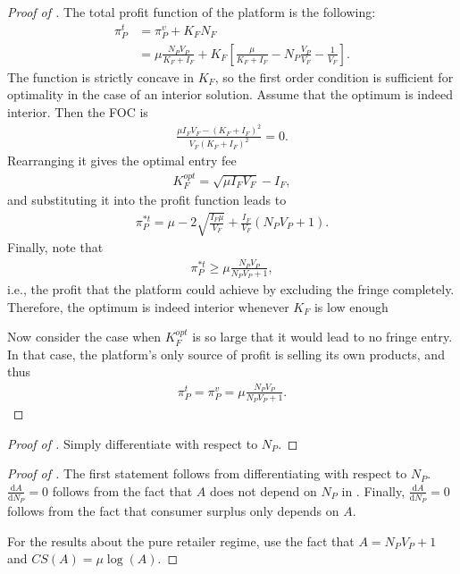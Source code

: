 \documentclass[a4paper]{article}
\newcommand{\dd}{\mathrm{d}}
\begin{document}
\begin{proof}[Proof of ]
    The total profit function of the platform is the following:
    \begin{align}
        \pi_P^t &= \pi_P^v + K_F N_F \nonumber \\
        &= \mu \frac{N_P V_P}{K_F + I_F} + K_F \left[ \frac{\mu}{K_F + I_F} - N_P \frac{V_P}{V_F} - \frac{1}{V_F} \right]. \label{eq:platform_profits}
    \end{align}
    The function is strictly concave in $K_F$, so the first order condition is sufficient for optimality in the case of an interior solution.
    Assume that the optimum is indeed interior.
    Then the FOC is
    \begin{align*}
        \frac{\mu I_F V_F - (K_F + I_F)^2}{V_F (K_F + I_F)^2} = 0.
    \end{align*}
    Rearranging it gives the optimal entry fee
    \begin{align*}
        K_F^{opt} = \sqrt{\mu I_F V_F} - I_F,
    \end{align*}
    and substituting it into the profit function leads to
    \begin{align*}
        \pi_P^{*t} = \mu - 2\sqrt{\frac{I_F \mu}{V_F}} + \frac{I_F}{V_F} (N_P V_P + 1).
    \end{align*}
    Finally, note that
    \begin{align*}
        \pi_P^{*t} \geq \mu \frac{N_P V_P}{N_P V_P + 1},
    \end{align*}
    i.e., the profit that the platform could achieve by excluding the fringe completely.
    Therefore, the optimum is indeed interior whenever $K_F$ is low enough

    Now consider the case when $K_F^{opt}$ is so large that it would lead to no fringe entry.
    In that case, the platform's only source of profit is selling its own products, and thus
    \begin{align*}
        \pi_P^{t} = \pi_P^{v} = \mu \frac{ N_P V_P}{N_P V_P + 1}.
    \end{align*}
\end{proof}

\begin{proof}[Proof of ]
    Simply differentiate  with respect to $N_P$.
\end{proof}

\begin{proof}[Proof of ]
    The first statement follows from differentiating  with respect to $N_P$.
    $\frac{\dd A}{\dd N_P} = 0$ follows from the fact that $A$ does not depend on $N_P$ in .
    Finally, $\frac{\dd A}{\dd N_P} = 0$ follows from the fact that consumer surplus only depends on $A$.
    
    For the results about the pure retailer regime, use the fact that $A = N_P V_P + 1$ and $CS(A) = \mu\log(A)$.
\end{proof}
\end{document}
